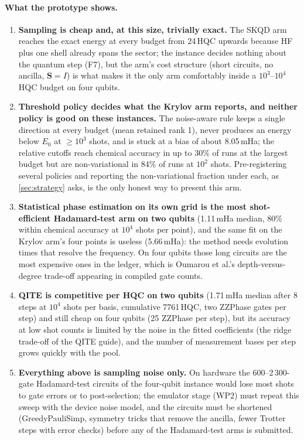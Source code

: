 \documentclass[11pt,a4paper]{article}
\begin{document}
\paragraph{What the prototype shows.}
\begin{enumerate}
\item \textbf{Sampling is cheap and, at this size, trivially exact.} The SKQD arm reaches the exact energy at every budget from 24\,HQC upwards because HF plus one shell already spans the sector; the instance decides nothing about the quantum step (F7), but the arm's cost structure (short circuits, no ancilla, $\mathbf S=I$) is what makes it the only arm comfortably inside a $10^3$--$10^4$ HQC budget on four qubits.
\item \textbf{Threshold policy decides what the Krylov arm reports, and neither policy is good on these instances.} The noise-aware rule keeps a single direction at every budget (mean retained rank 1), never produces an energy below $E_0$ at $\ge10^3$ shots, and is stuck at a bias of about 8.05\,mHa; the relative cutoffs reach chemical accuracy in up to 30\% of runs at the largest budget but are non-variational in 84\% of runs at $10^2$ shots. Pre-registering several policies and reporting the non-variational fraction under each, as \cref{sec:strategy} asks, is the only honest way to present this arm.
\item \textbf{Statistical phase estimation on its own grid is the most shot-efficient Hadamard-test arm on two qubits} (1.11\,mHa median, 80\% within chemical accuracy at $10^4$ shots per point), and the same fit on the Krylov arm's four points is useless (5.66\,mHa): the method needs evolution times that resolve the frequency. On four qubits those long circuits are the most expensive ones in the ledger, which is Oumarou et al.'s depth-versus-degree trade-off appearing in compiled gate counts.
\item \textbf{QITE is competitive per HQC on two qubits} (1.71\,mHa median after 8 steps at $10^4$ shots per basis, cumulative 7761\,HQC, two ZZPhase gates per step) and still cheap on four qubits (25 ZZPhase per step), but its accuracy at low shot counts is limited by the noise in the fitted coefficients (the ridge trade-off of the QITE guide), and the number of measurement bases per step grows quickly with the pool.
\item \textbf{Everything above is sampling noise only.} On hardware the 600--2\,300-gate Hadamard-test circuits of the four-qubit instance would lose most shots to gate errors or to post-selection; the emulator stage (WP2) must repeat this sweep with the device noise model, and the circuits must be shortened (GreedyPauliSimp, symmetry tricks that remove the ancilla, fewer Trotter steps with error checks) before any of the Hadamard-test arms is submitted.
\end{enumerate}
\end{document}
